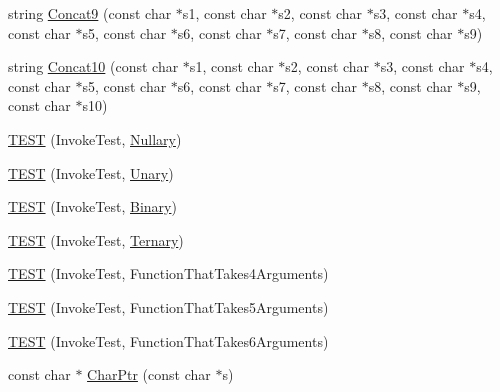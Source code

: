 \begin{DoxyCompactItemize}
\item 
string \hyperlink{namespacetesting_1_1gmock__more__actions__test_a9f8c8c01bc080a04d798060dad757cf9}{Concat9} (const char $\ast$s1, const char $\ast$s2, const char $\ast$s3, const char $\ast$s4, const char $\ast$s5, const char $\ast$s6, const char $\ast$s7, const char $\ast$s8, const char $\ast$s9)
\item 
string \hyperlink{namespacetesting_1_1gmock__more__actions__test_aba6aadf0de090a08bf9e467cdc09ffd8}{Concat10} (const char $\ast$s1, const char $\ast$s2, const char $\ast$s3, const char $\ast$s4, const char $\ast$s5, const char $\ast$s6, const char $\ast$s7, const char $\ast$s8, const char $\ast$s9, const char $\ast$s10)
\item 
\hyperlink{namespacetesting_1_1gmock__more__actions__test_a9c5fbd26c6cc6ed31aed5bafb2fa8e5c}{T\+E\+ST} (Invoke\+Test, \hyperlink{namespacetesting_1_1gmock__more__actions__test_acdd2dd80f777fdb770b513b63064ac19}{Nullary})
\item 
\hyperlink{namespacetesting_1_1gmock__more__actions__test_a28b57a9f9d38574b7c033988ad528ddd}{T\+E\+ST} (Invoke\+Test, \hyperlink{namespacetesting_1_1gmock__more__actions__test_aad456ea2ee1b0cb2741b676a34f540a3}{Unary})
\item 
\hyperlink{namespacetesting_1_1gmock__more__actions__test_a906bd5cc7aa38e2cc861a9732481fce7}{T\+E\+ST} (Invoke\+Test, \hyperlink{namespacetesting_1_1gmock__more__actions__test_a853c9f048674a60798b930750b74a1df}{Binary})
\item 
\hyperlink{namespacetesting_1_1gmock__more__actions__test_a424fb6113c6c1ab2157edf854a4ae9fe}{T\+E\+ST} (Invoke\+Test, \hyperlink{namespacetesting_1_1gmock__more__actions__test_ab98b352528a0b72625b4710a6fc648a1}{Ternary})
\item 
\hyperlink{namespacetesting_1_1gmock__more__actions__test_a17f41c1f7f180371d4d240089cdff0dd}{T\+E\+ST} (Invoke\+Test, Function\+That\+Takes4\+Arguments)
\item 
\hyperlink{namespacetesting_1_1gmock__more__actions__test_a3b6b1b682295a1d04d57374445359e94}{T\+E\+ST} (Invoke\+Test, Function\+That\+Takes5\+Arguments)
\item 
\hyperlink{namespacetesting_1_1gmock__more__actions__test_a9a6c89b83ba253838d05d7ee5da7d954}{T\+E\+ST} (Invoke\+Test, Function\+That\+Takes6\+Arguments)
\item 
const char $\ast$ \hyperlink{namespacetesting_1_1gmock__more__actions__test_aa19ac39aaa785adeb8d7837d58b824f3}{Char\+Ptr} (const char $\ast$s)
\item 

\end{DoxyCompactItemize}
